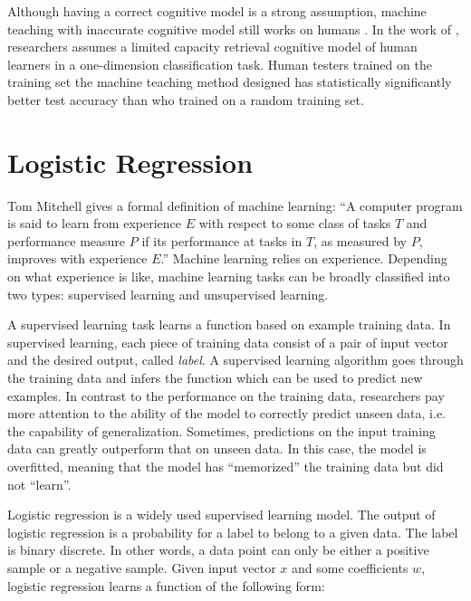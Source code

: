         Although having a correct cognitive model is a strong assumption,
        machine teaching with inaccurate cognitive model still works on humans \cite{Whitehill2017}.
        In the work of \cite{Patil2014},
        researchers assumes a limited capacity retrieval cognitive model of human learners
        in a one-dimension classification task.
        Human testers trained on the training set the machine teaching method designed
        has statistically significantly better test accuracy than who trained on a random training set.


\section{Logistic Regression}

    Tom Mitchell gives a formal definition of machine learning:
    ``A computer program is said to learn from experience $E$ with respect to some class of tasks $T$
    and performance measure $P$ if its performance at tasks in $T$, as measured by $P$, improves with experience $E$.''
    \cite{Mitchell1997}
    Machine learning relies on experience.
    Depending on what experience is like, machine learning tasks can be broadly classified into two types:
    supervised learning and unsupervised learning.

    A supervised learning task learns a function based on example training data.
    In supervised learning, each piece of training data consist of a pair of input vector
    and the desired output, called \emph{label}.
    A supervised learning algorithm goes through the training data and infers the function
    which can be used to predict new examples.
    In contrast to the performance on the training data,
    researchers pay more attention to the ability of the model to correctly predict unseen data,
    i.e. the capability of generalization.
    Sometimes, predictions on the input training data can greatly outperform that on unseen data.
    In this case, the model is overfitted, meaning that the model has ``memorized'' the training data
    but did not ``learn''.

    Logistic regression is a widely used supervised learning model.
    The output of logistic regression is a probability for a label to belong to a given data.
    The label is binary discrete.
    In other words, a data point can only be either a positive sample or a negative sample.
    Given input vector $x$ and some coefficients $w$,
    logistic regression learns a function of the following form:

